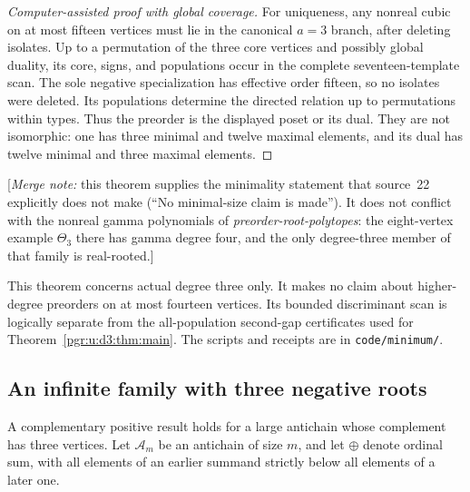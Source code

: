\documentclass[11pt]{article}
\numberwithin{equation}{section}
\theoremstyle{definition}\newtheorem{definition}[theorem]{Definition}\newtheorem{remark}[theorem]{Remark}
\newcommand{\mnote}[1]{[\textit{Merge note:} #1]}
\newcommand{\prp}{\emph{preorder-root-polytopes}}
\begin{document}
\begin{proof}[Computer-assisted proof with global coverage]
For uniqueness, any nonreal cubic on at most fifteen vertices must lie in the canonical $a=3$ branch, after deleting isolates. Up to a permutation of the three core vertices and possibly global duality, its core, signs, and populations occur in the complete seventeen-template scan. The sole negative specialization has effective order fifteen, so no isolates were deleted. Its populations determine the directed relation up to permutations within types. Thus the preorder is the displayed poset or its dual. They are not isomorphic: one has three minimal and twelve maximal elements, and its dual has twelve minimal and three maximal elements.
\end{proof}


\mnote{this theorem supplies the minimality statement that source~22
explicitly does not make (``No minimal-size claim is made''). It does not
conflict with the nonreal gamma polynomials of \prp: the eight-vertex
example $\Theta_3$ there has gamma degree four, and the only degree-three
member of that family is real-rooted.}

This theorem concerns actual degree three only. It makes no claim about higher-degree preorders on at most fourteen vertices. Its bounded discriminant scan is logically separate from the all-population second-gap certificates used for Theorem~\ref{pgr:u:d3:thm:main}. The scripts and receipts are in \texttt{code/minimum/}.


\subsection{An infinite family with three negative roots}\label{pgr:u:d3:sec:ordinal}

A complementary positive result holds for a large antichain whose complement has three vertices. Let $\mathcal A_m$ be an antichain of size $m$, and let $\oplus$ denote ordinal sum, with all elements of an earlier summand strictly below all elements of a later one.
\end{document}
